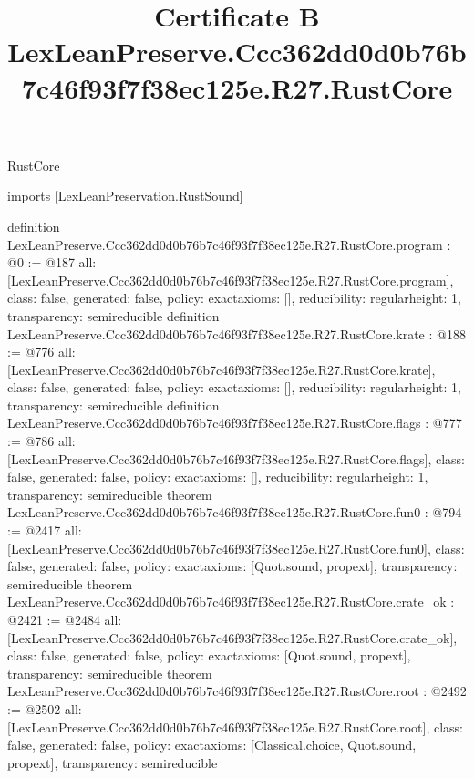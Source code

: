\begin{lexlean}{RustCore}
\title{Certificate B LexLeanPreserve.Ccc362dd0d0b76b7c46f93f7f38ec125e.R27.RustCore}
\begin{coremodule}
imports [LexLeanPreservation.RustSound]

definition LexLeanPreserve.Ccc362dd0d0b76b7c46f93f7f38ec125e.R27.RustCore.program : @0 := @187 {
  all: [LexLeanPreserve.Ccc362dd0d0b76b7c46f93f7f38ec125e.R27.RustCore.program],
  class: false,
  generated: false,
  policy: exact{axioms: []},
  reducibility: regular{height: 1},
  transparency: semireducible
}
definition LexLeanPreserve.Ccc362dd0d0b76b7c46f93f7f38ec125e.R27.RustCore.krate : @188 := @776 {
  all: [LexLeanPreserve.Ccc362dd0d0b76b7c46f93f7f38ec125e.R27.RustCore.krate],
  class: false,
  generated: false,
  policy: exact{axioms: []},
  reducibility: regular{height: 1},
  transparency: semireducible
}
definition LexLeanPreserve.Ccc362dd0d0b76b7c46f93f7f38ec125e.R27.RustCore.flags : @777 := @786 {
  all: [LexLeanPreserve.Ccc362dd0d0b76b7c46f93f7f38ec125e.R27.RustCore.flags],
  class: false,
  generated: false,
  policy: exact{axioms: []},
  reducibility: regular{height: 1},
  transparency: semireducible
}
theorem LexLeanPreserve.Ccc362dd0d0b76b7c46f93f7f38ec125e.R27.RustCore.fun0 : @794 := @2417 {
  all: [LexLeanPreserve.Ccc362dd0d0b76b7c46f93f7f38ec125e.R27.RustCore.fun0],
  class: false,
  generated: false,
  policy: exact{axioms: [Quot.sound, propext]},
  transparency: semireducible
}
theorem LexLeanPreserve.Ccc362dd0d0b76b7c46f93f7f38ec125e.R27.RustCore.crate_ok : @2421 := @2484 {
  all: [LexLeanPreserve.Ccc362dd0d0b76b7c46f93f7f38ec125e.R27.RustCore.crate_ok],
  class: false,
  generated: false,
  policy: exact{axioms: [Quot.sound, propext]},
  transparency: semireducible
}
theorem LexLeanPreserve.Ccc362dd0d0b76b7c46f93f7f38ec125e.R27.RustCore.root : @2492 := @2502 {
  all: [LexLeanPreserve.Ccc362dd0d0b76b7c46f93f7f38ec125e.R27.RustCore.root],
  class: false,
  generated: false,
  policy: exact{axioms: [Classical.choice, Quot.sound, propext]},
  transparency: semireducible
}


\end{coremodule}
\end{lexlean}
